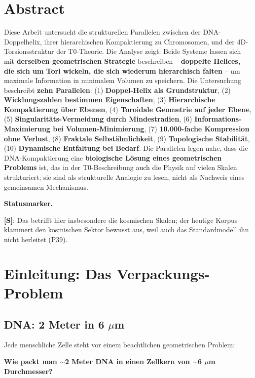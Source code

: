 \section*{Abstract}
		Diese Arbeit untersucht die strukturellen Parallelen zwischen der DNA-Doppelhelix, ihrer hierarchischen Kompaktierung zu Chromosomen, und der 4D-Torsionsstruktur der T0-Theorie. Die Analyse zeigt: Beide Systeme lassen sich mit \textbf{derselben geometrischen Strategie} beschreiben -- \textbf{doppelte Helices, die sich um Tori wickeln, die sich wiederum hierarchisch falten} -- um maximale Information in minimalem Volumen zu speichern. Die Untersuchung beschreibt \textbf{zehn Parallelen}: (1) \textbf{Doppel-Helix als Grundstruktur}, (2) \textbf{Wicklungszahlen bestimmen Eigenschaften}, (3) \textbf{Hierarchische Kompaktierung über Ebenen}, (4) \textbf{Toroidale Geometrie auf jeder Ebene}, (5) \textbf{Singularitäts-Vermeidung durch Mindestradien}, (6) \textbf{Informations-Maximierung bei Volumen-Minimierung}, (7) \textbf{10.000-fache Kompression ohne Verlust}, (8) \textbf{Fraktale Selbstähnlichkeit}, (9) \textbf{Topologische Stabilität}, (10) \textbf{Dynamische Entfaltung bei Bedarf}. Die Parallelen legen nahe, dass die DNA-Kompaktierung eine \textbf{biologische Lösung eines geometrischen Problems} ist, das in der T0-Beschreibung auch die Physik auf vielen Skalen strukturiert; sie sind als strukturelle Analogie zu lesen, nicht als Nachweis eines gemeinsamen Mechanismus.

	\medskip\noindent\textbf{Statusmarker.}
	

	\noindent \textbf{[S]}: Das betrifft hier insbesondere die kosmischen Skalen; der heutige Korpus klammert den kosmischen Sektor bewusst aus, weil auch das Standardmodell ihn nicht herleitet (P39).




	\section{Einleitung: Das Verpackungs-Problem}

	\subsection{DNA: 2 Meter in 6 $\mu$m}

	Jede menschliche Zelle steht vor einem beachtlichen geometrischen Problem:

	\begin{center}

		\textbf{Wie packt man $\sim$2 Meter DNA in einen Zellkern von $\sim$6 $\mu$m Durchmesser?}
	\end{center}

